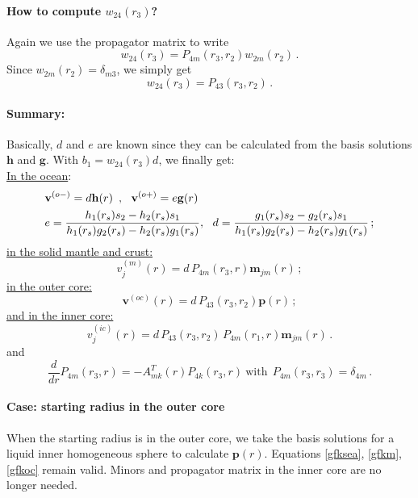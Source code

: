 \documentclass[12pt,a4paper]{article}
\begin{document}
\paragraph{How to compute $w_{24}(r_3)$?}
Again we use the propagator matrix to write
\begin{equation}
w_{24}(r_3) = P_{4m}(r_3,r_2)w_{2m}(r_2) \,.
\end{equation}
Since $w_{2m}(r_2) = \delta_{m3}$, we simply get
\begin{equation}
w_{24}(r_3) = P_{43}(r_3,r_2) \,.
\end{equation}
%
\paragraph{Summary:}
Basically, $d$ and $e$ are known since they can be calculated from the basis solutions $\mathbf{h}$ and $\mathbf{g}$.
With $b_1 = w_{24}(r_3) d$, we finally get:\\
\underline{In the ocean}:
\begin{align}\label{gfksea}
&\mathbf{v}^{(o-)} = d\mathbf{h}(r) \ \,,\ \ \mathbf{v}^{(o+)} = e\mathbf{g}(r) \notag \\
&e = \frac{h_1(r_s)s_2-h_2(r_s)s_1}{h_1(r_s)g_2(r_s)-h_2(r_s)g_1(r_s)}, \ \ d = \frac{g_1(r_s)s_2-g_2(r_s)s_1}{h_1(r_s)g_2(r_s)-h_2(r_s)g_1(r_s)} \,;
\end{align}
\underline{in the solid mantle and crust:}
\begin{equation}\label{gfkm}
v_j^{(m)}(r) = d\,P_{4m}(r_3,r) \mathbf{m}_{jm}(r) \,;
\end{equation}
\underline{in the outer core:}
\begin{equation}\label{gfkoc}
\mathbf{v}^{(oc)}(r) =  d\,P_{43}(r_3,r_2)\mathbf{p}(r) \,;
\end{equation}
\underline{and in the inner core:}
\begin{equation}\label{gfkic}
v_j^{(ic)}(r) =   d\,P_{43}(r_3,r_2)\,P_{4m}(r_1,r) \mathbf{m}_{jm}(r) \,.
\end{equation}
and
\begin{equation}
\frac{d}{dr}P_{4m}(r_3,r) = -A^T_{mk}(r)P_{4k}(r_3,r) \ \mathrm{with}\ \  P_{4m}(r_3,r_3) = \delta_{4m}\,.
\end{equation}

%
\paragraph{Case: starting radius in the outer core}
When the starting radius is in the outer core, we take the basis solutions for a liquid inner homogeneous sphere to calculate $\mathbf{p}(r)$. Equations \ref{gfksea}, \ref{gfkm}, \ref{gfkoc} remain valid. Minors and propagator matrix in the inner core are no longer needed.
%
\end{document}
